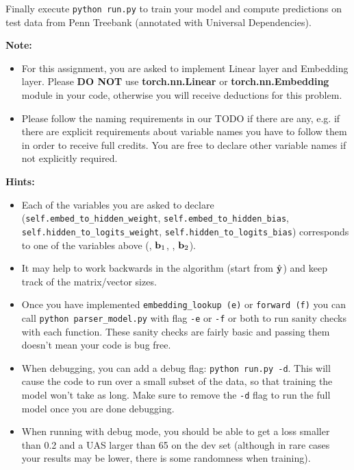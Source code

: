 \begin{parts}
    Finally execute \texttt{python run.py} to train your model and compute predictions
    on test data from Penn Treebank (annotated with Universal Dependencies). 
    
    \textbf{Note:}
    \begin{itemize}
        \item For this assignment, you are asked to implement Linear layer and Embedding layer. Please \textbf{DO NOT} use \textbf{torch.nn.Linear} or  \textbf{torch.nn.Embedding} module in your code, otherwise you will receive deductions for this problem. 
        \item Please follow the naming requirements in our TODO if there are any, e.g. if there are explicit requirements about variable names you have to follow them in order to receive full credits. You are free to declare other variable names if not explicitly required. 
    \end{itemize}
    
    \textbf{Hints:}
    \begin{itemize}
        \item Each of the variables you are asked to declare (\texttt{self.embed\_to\_hidden\_weight}, \newline \texttt{self.embed\_to\_hidden\_bias}, \texttt{self.hidden\_to\_logits\_weight}, \newline \texttt{self.hidden\_to\_logits\_bias}) corresponds to one of the variables above (\bW, $\mathbf{b}_1$, \bU, $\mathbf{b}_2$).  
        \item It may help to work backwards in the algorithm (start from $\hat{\mathbf{y}}$) and keep track of the matrix/vector sizes.  
        \item Once you have implemented \texttt{embedding\_lookup (e)} or \texttt{forward (f)} you can call \texttt{python parser\_model.py} with flag \texttt{-e} or \texttt{-f} or both to run sanity checks with each function. These sanity checks are fairly basic and passing them doesn't mean your code is bug free.
        \item
            When debugging, you can add a debug flag: \texttt{python run.py -d}. This will cause the code to run over a small subset of the data, so that training the model won't take as long. Make sure to remove the \texttt{-d} flag to run the full model once you are done debugging.

        \item
            When running with debug mode, you should be able to get a loss smaller than 0.2 and a UAS larger than 65 on the dev set (although in rare cases your results may be lower, there is some randomness when training).
        

\end{itemize}
\end{parts}
